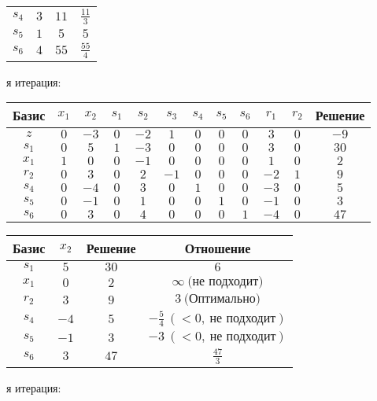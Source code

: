 \documentclass{article}%
\begin{document}
\begin{flushleft}
\begin{tabular}{|cccc|}
$s_{4}$&$3$&$11$&$\frac{11}{3}$\\%
$s_{5}$&$1$&$5$&$5$\\%
$s_{6}$&$4$&$55$&$\frac{55}{4}$\\%
\hline%
\end{tabular}%
\newline%
\newline%
я итерация: %
\newline%
\newline%
\renewcommand{\arraystretch}{1.3}%
\begin{tabular}{|c|cccccccccc|c|}%
\hline%
Базис&$x_{1}$&$x_{2}$&$s_{1}$&$s_{2}$&$s_{3}$&$s_{4}$&$s_{5}$&$s_{6}$&$r_{1}$&$r_{2}$&Решение\\%
\hline%
$z$&$0$&$-3$&$0$&$-2$&$1$&$0$&$0$&$0$&$3$&$0$&$-9$\\%
\hline%
$s_{1}$&$0$&$5$&$1$&$-3$&$0$&$0$&$0$&$0$&$3$&$0$&$30$\\%
$x_{1}$&$1$&$0$&$0$&$-1$&$0$&$0$&$0$&$0$&$1$&$0$&$2$\\%
$r_{2}$&$0$&$3$&$0$&$2$&$-1$&$0$&$0$&$0$&$-2$&$1$&$9$\\%
$s_{4}$&$0$&$-4$&$0$&$3$&$0$&$1$&$0$&$0$&$-3$&$0$&$5$\\%
$s_{5}$&$0$&$-1$&$0$&$1$&$0$&$0$&$1$&$0$&$-1$&$0$&$3$\\%
$s_{6}$&$0$&$3$&$0$&$4$&$0$&$0$&$0$&$1$&$-4$&$0$&$47$\\%
\hline%
\end{tabular}%
\newline%
\newline%
\newline%
\begin{tabular}{|cccc|}%
\hline%
Базис&$x_{2}$&Решение&Отношение\\%
\hline%
$s_{1}$&$5$&$30$&$6$\\%
$x_{1}$&$0$&$2$&$\infty \: \text{(не подходит)}$\\%
$r_{2}$&$3$&$9$&$3\: \text{(Оптимально)}$\\%
$s_{4}$&$-4$&$5$&$-\frac{5}{4}\: (< 0, \: \text{не подходит})$\\%
$s_{5}$&$-1$&$3$&$-3\: (< 0, \: \text{не подходит})$\\%
$s_{6}$&$3$&$47$&$\frac{47}{3}$\\%
\hline%
\end{tabular}%
\newline%
\newline%
я итерация: %

\end{flushleft}
\end{document}
